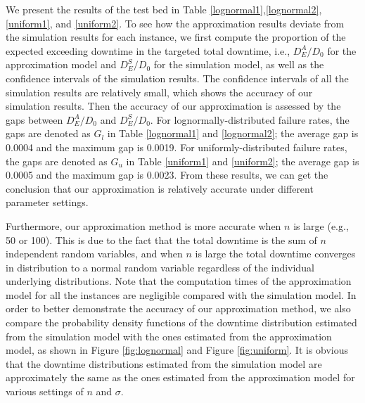 \documentclass[preprint,12pt]{elsarticle}
\begin{document}
We present the results of the test bed in Table \ref{lognormal1},\ref{lognormal2}, \ref{uniform1}, and \ref{uniform2}. To see how the approximation results deviate from the simulation results for each instance, we first compute the proportion of the expected exceeding downtime in the targeted total downtime, i.e., $D_{E}^{A}/D_0$ for the approximation model and $D_{E}^{S}/D_0$ for the simulation model, as well as the confidence intervals of the simulation results. The confidence intervals of all the simulation results are relatively small, which shows the accuracy of our simulation results. Then the accuracy of our approximation is assessed by the gaps between $D_{E}^{A}/D_0$ and $D_{E}^{S}/D_0$. For lognormally-distributed failure rates, the gaps are denoted as $G_l$ in Table \ref{lognormal1} and \ref{lognormal2}; the average gap is 0.0004 and the maximum gap is 0.0019. For uniformly-distributed failure rates, the gaps are denoted as $G_u$ in Table \ref{uniform1} and \ref{uniform2}; the average gap is  0.0005 and the maximum gap is 0.0023. From these results, we can get the conclusion that our approximation is relatively accurate under different parameter settings.


Furthermore, our approximation method is more accurate when $n$ is large (e.g., 50 or 100). This is due to the fact that the total downtime is the sum of $n$ independent random variables, and when $n$ is large the total downtime converges in distribution to a normal random variable regardless of the individual underlying distributions. Note that the computation times of the approximation model for all the instances are negligible compared with the simulation model. In order to better demonstrate the accuracy of our approximation method, we also compare the probability density functions of the downtime distribution estimated from the simulation model with the ones estimated from the approximation model, as shown in Figure \ref{fig:lognormal} and Figure \ref{fig:uniform}. It is obvious that the downtime distributions estimated from the simulation model are approximately the same as the ones estimated from the approximation model for various settings of $n$ and $\sigma$.
\end{document}
